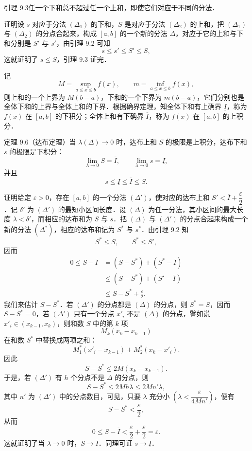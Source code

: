 {\thmheadfont 引理 9.3}\quad 任一个下和总不超过任一个上和，即使它们对应于不同的分法．

{\thmheadfont 证明}\quad 设 $s$ 对应于分法 $(\Delta_1)$ 的下和，$S$ 是对应于分法 $(\Delta_2)$ 的上和，把 $(\Delta_1)$ 与 $(\Delta_2)$ 的分点合起来，构成 $[a, b]$ 的一个新的分法 $\Delta$，对应于它的上和与下和分别是 $S'$ 与 $s'$，由引理 9.2 可知
\[
s \leqslant s' \leqslant S' \leqslant S,
\]
这就证明了 $s \leqslant S$，引理 9.3 证完．

记
\[
M = \sup_{a \leqslant x \leqslant b} f(x), \qquad m = \inf_{a \leqslant x \leqslant b} f(x),
\]
则上和的一个上界为 $M(b - a)$，下和的一个下界为 $m(b - a)$，它们分别也是全体下和的上界与全体上和的下界．根据确界定理，知全体下和有上确界 $\underline{I}$，称为 $f(x)$ 在 $[a, b]$ 的下积分；全体上和有下确界 $\overline{I}$，称为 $f(x)$ 在 $[a, b]$ 的上积分．

{\thmheadfont 定理 9.6（达布定理）}\quad 当 $\lambda(\Delta) \to 0$ 时，达布上和 $S$ 的极限是上积分，达布下和 $s$ 的极限是下积分：
\[
\lim_{\lambda \to 0} S = \overline{I}, \qquad \lim_{\lambda \to 0} s = \underline{I},
\]
并且
\[
s \leqslant \underline{I} \leqslant \overline{I} \leqslant S.
\]

{\thmheadfont 证明}\quad 给定 $\varepsilon > 0$，存在 $[a, b]$ 的一个分法 $(\Delta')$，使对应的达布上和 $S' < \overline{I} + \dfrac{\varepsilon}{2}$．记 $\delta'$ 为 $(\Delta')$ 的最短小区间长度．设 $(\Delta)$ 为任一分法，其小区间的最大长度 $\lambda < \delta'$，而相应的达布和为 $S$ 与 $s$．把 $(\Delta)$ 与 $(\Delta')$ 的分点合起来构成一个新的分法 $(\Delta^*)$，相应的达布和记为 $S^*$ 与 $s^*$．由引理 9.2 知
\[
S^* \leqslant S, \qquad S^* \leqslant S',
\]
因而
\[
\begin{aligned}
0 \leqslant S - \overline{I} &= \left( S - S^* \right) + \left( S^* - \overline{I} \right) \\
&\leqslant \left( S - S^* \right) + \left( S' - \overline{I} \right) \\
&\leqslant S - S^* + \frac{\varepsilon}{2}.
\end{aligned}
\]
我们来估计 $S - S^*$．若 $(\Delta')$ 的分点都是 $(\Delta)$ 的分点，则 $S^* = S$，因而 $S - S^* = 0$，若 $(\Delta')$ 只有一个分点 $x'_i$ 不是 $(\Delta)$ 的分点，譬如说 $x'_i \in (x_{k-1}, x_k)$，则和数 $S$ 中的第 $k$ 项
\[
M_k \left( x_k - x_{k-1} \right)
\]
在和数 $S^*$ 中替换成两项之和：
\[
M_1^* \left( x'_i - x_{k-1} \right) + M_2^* \left( x_k - x'_i \right).
\]
因此
\[
S - S^* \leqslant 2M \left( x_k - x_{k-1} \right).
\]
于是，若 $(\Delta')$ 有 $h$ 个分点不是 $\Delta$ 的分点，则
\[
S - S^* \leqslant 2Mh\lambda \leqslant 2Mn'\lambda,
\]
其中 $n'$ 为 $(\Delta')$ 中的分点数目，可见，只要 $\lambda$ 充分小 $\left( \lambda < \dfrac{\varepsilon}{4Mn'} \right)$，便有
\[
S - S^* < \frac{\varepsilon}{2},
\]
从而
\[
0 \leqslant S - \overline{I} < \frac{\varepsilon}{2} + \frac{\varepsilon}{2} = \varepsilon.
\]
这就证明了当 $\lambda \to 0$ 时，$S \to \overline{I}$．同理可证 $s \to \underline{I}$．

